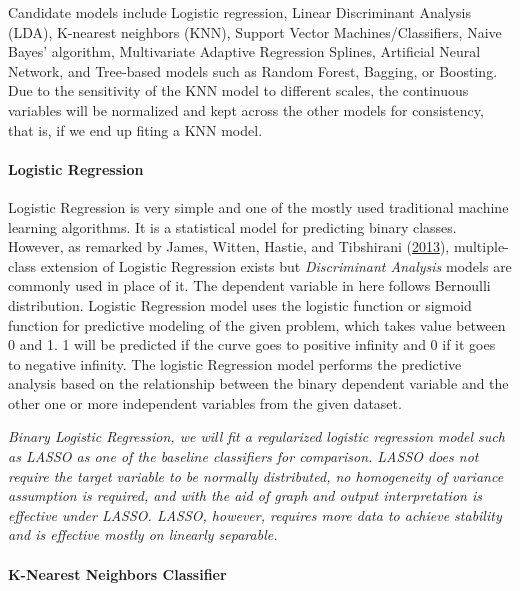 \documentclass[
  10pt,
]{article}
\begin{document}
Candidate models include Logistic regression, Linear Discriminant Analysis (LDA), K-nearest neighbors (KNN), Support Vector Machines/Classifiers, Naive Bayes' algorithm, Multivariate Adaptive Regression Splines, Artificial Neural Network, and Tree-based models such as Random Forest, Bagging, or Boosting. Due to the sensitivity of the KNN model to different scales, the continuous variables will be normalized and kept across the other models for consistency, that is, if we end up fiting a KNN model.

\hypertarget{logistic-regression}{%
\paragraph{\texorpdfstring{Logistic Regression }{Logistic Regression  }}\label{logistic-regression}}

Logistic Regression is very simple and one of the mostly used traditional machine learning algorithms. It is a statistical model for predicting binary classes. However, as remarked by James, Witten, Hastie, and Tibshirani (\protect\hyperlink{ref-james2013introduction}{2013}), multiple-class extension of Logistic Regression exists but \emph{Discriminant Analysis} models are commonly used in place of it. The dependent variable in here follows Bernoulli distribution. Logistic Regression model uses the logistic function or sigmoid function for predictive modeling of the given problem, which takes value between 0 and 1. 1 will be predicted if the curve goes to positive infinity and 0 if it goes to negative infinity. The logistic Regression model performs the predictive analysis based on the relationship between the binary dependent variable and the other one or more independent variables from the given dataset.

\emph{Binary Logistic Regression, we will fit a regularized logistic regression model such as LASSO as one of the baseline classifiers for comparison. LASSO does not require the target variable to be normally distributed, no homogeneity of variance assumption is required, and with the aid of graph and output interpretation is effective under LASSO. LASSO, however, requires more data to achieve stability and is effective mostly on linearly separable.}

\hypertarget{k-nearest-neighbors-classifier}{%
\paragraph{K-Nearest Neighbors Classifier}\label{k-nearest-neighbors-classifier}}
\end{document}
